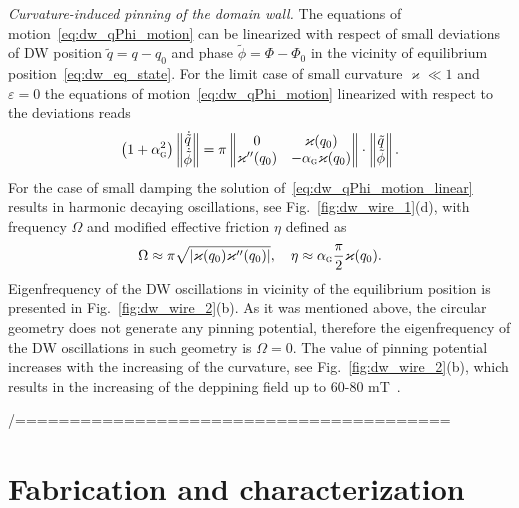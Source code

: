 {\it Curvature-induced pinning of the domain wall.} The equations of motion~\eqref{eq:dw_qPhi_motion} can be linearized with respect of small deviations of DW position $\tilde{q}=q-q_0$ and phase $\tilde{\phi}=\Phi-\Phi_0$ in the vicinity of equilibrium position~\eqref{eq:dw_eq_state}. For the limit case of small curvature $\varkappa\ll1$ and $\varepsilon=0$ the equations of motion~\eqref{eq:dw_qPhi_motion} linearized with respect to the deviations reads~\cite{Yershov15b}
\begin{equation}\label{eq:dw_qPhi_motion_linear}
\left(1+\alpha_\textsc{g}^2\right)\left\|\begin{matrix}
\dot{\tilde{q}}\\
\dot{\tilde{\phi}}
\end{matrix}\right\|=\pi\left\|\begin{matrix}
0 & \varkappa(q_0)\\
\varkappa''(q_0)&-\alpha_\textsc{g}\varkappa(q_0)
\end{matrix}\right\|\cdot\left\|\begin{matrix}
\tilde{q}\\
\tilde{\phi}
\end{matrix}\right\|.
\end{equation}
For the case of small damping the solution of~\eqref{eq:dw_qPhi_motion_linear} results in harmonic decaying oscillations, see Fig.~\ref{fig:dw_wire_1}(d), with frequency $\Omega$ and modified effective friction $\eta$ defined as
\begin{equation}
\Omega \approx \pi\sqrt{|\varkappa(q_0)\varkappa''(q_0)|},\quad \eta\approx \alpha_\textsc{g}\frac{\pi}{2}\varkappa(q_0).
\end{equation}
Eigenfrequency of the DW oscillations in vicinity of the equilibrium position is presented in Fig.~\ref{fig:dw_wire_2}(b). As it was mentioned above, the circular geometry does not generate any pinning potential, therefore the eigenfrequency of the DW oscillations in such geometry is $\Omega=0$. The value of pinning potential increases with the increasing of the curvature, see Fig.~\ref{fig:dw_wire_2}(b), which results in the increasing of the deppining field up to 60-80 mT~\cite{Volkov19c,Lewis09}.




/========================================

\section{Fabrication and characterization}\label{sec:fabrication}

